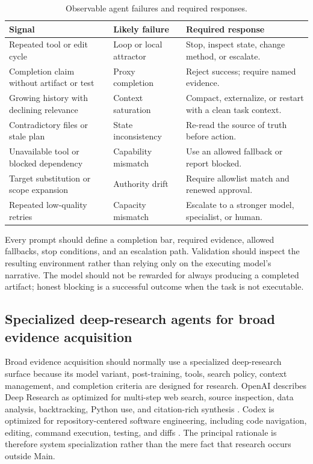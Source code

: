 \documentclass[11pt,a4paper]{article}
\begin{document}
\begin{table}[H]
\centering
\caption{Observable agent failures and required responses.}
\begin{tabularx}{\textwidth}{P{0.25\textwidth}P{0.27\textwidth}Y}
\toprule
\textbf{Signal} & \textbf{Likely failure} & \textbf{Required response} \\
\midrule
Repeated tool or edit cycle & Loop or local attractor & Stop, inspect state, change method, or escalate. \\
Completion claim without artifact or test & Proxy completion & Reject success; require named evidence. \\
Growing history with declining relevance & Context saturation & Compact, externalize, or restart with a clean task context. \\
Contradictory files or stale plan & State inconsistency & Re-read the source of truth before action. \\
Unavailable tool or blocked dependency & Capability mismatch & Use an allowed fallback or report blocked. \\
Target substitution or scope expansion & Authority drift & Require allowlist match and renewed approval. \\
Repeated low-quality retries & Capacity mismatch & Escalate to a stronger model, specialist, or human. \\
\bottomrule
\end{tabularx}
\end{table}

Every prompt should define a completion bar, required evidence, allowed fallbacks, stop conditions, and an escalation path. Validation should inspect the resulting environment rather than relying only on the executing model's narrative. The model should not be rewarded for always producing a completed artifact; honest blocking is a successful outcome when the task is not executable.

\subsection{Specialized deep-research agents for broad evidence acquisition}\label{sec:research-rationale}

Broad evidence acquisition should normally use a specialized deep-research surface because its model variant, post-training, tools, search policy, context management, and completion criteria are designed for research. OpenAI describes Deep Research as optimized for multi-step web search, source inspection, data analysis, backtracking, Python use, and citation-rich synthesis \cite{openairesearch2025}. Codex is optimized for repository-centered software engineering, including code navigation, editing, command execution, testing, and diffs \cite{openaicodex2025}. The principal rationale is therefore system specialization rather than the mere fact that research occurs outside Main.
\end{document}
